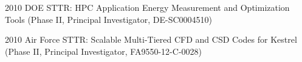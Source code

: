 \begin{itemize}
 	
 	
 	
 	
 	
 	
	2010 DOE STTR: HPC Application Energy Measurement and
 	   Optimization Tools (Phase II, Principal Investigator,
 	   DE-SC0004510)
 	
 	2010 Air Force STTR: Scalable Multi-Tiered CFD and CSD
 		Codes for Kestrel (Phase II, Principal Investigator,
 		FA9550-12-C-0028)
 	

\end{itemize}
